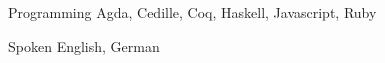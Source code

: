

\begin{cvskills}

  \cvskill
    {Programming} %
    {Agda, Cedille, Coq, Haskell, Javascript, Ruby} %


  \cvskill
    {Spoken} %
    {English, German} %

\end{cvskills}
